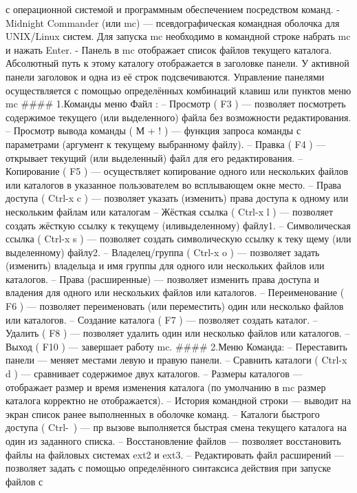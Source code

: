 \documentclass[
  english,
  russian,
  12pt,
  a4paper,
  DIV=11,
  numbers=noendperiod]{scrreprt}
\begin{document}
с операционной системой и программным обеспечением посредством команд. -
Midnight Commander (или mc) --- псевдографическая командная оболочка для
UNIX/Linux систем. Для запуска mc необходимо в командной строке набрать
mc и нажать Enter. - Панель в mc отображает список файлов текущего
каталога. Абсолютный путь к этому каталогу отображается в заголовке
панели. У активной панели заголовок и одна из её строк подсвечиваются.
Управление панелями осуществляется с помощью определённых комбинаций
клавиш или пунктов меню mc \#\#\#\# 1.Команды меню Файл : -- Просмотр (
F3 ) --- позволяет посмотреть содержимое текущего (или выделенного)
файла без возможности редактирования. -- Просмотр вывода команды ( М + !
) --- функция запроса команды с параметрами (аргумент к текущему
выбранному файлу). -- Правка ( F4 ) --- открывает текущий (или
выделенный) файл для его редактирования. -- Копирование ( F5 ) ---
осуществляет копирование одного или нескольких файлов или каталогов в
указанное пользователем во всплывающем окне место. -- Права доступа (
Ctrl-x c ) --- позволяет указать (изменить) права доступа к одному или
нескольким файлам или каталогам -- Жёсткая ссылка ( Ctrl-x l ) ---
позволяет создать жёсткую ссылку к текущему (иливыделенному) файлу1. --
Символическая ссылка ( Ctrl-x s ) --- позволяет создать символическую
ссылку к теку щему (или выделенному) файлу2. -- Владелец/группа ( Ctrl-x
o ) --- позволяет задать (изменить) владельца и имя группы для одного
или нескольких файлов или каталогов. -- Права (расширенные) ---
позволяет изменить права доступа и владения для одного или нескольких
файлов или каталогов. -- Переименование ( F6 ) --- позволяет
переименовать (или переместить) один или несколько файлов или каталогов.
-- Создание каталога ( F7 ) --- позволяет создать каталог. -- Удалить (
F8 ) --- позволяет удалить один или несколько файлов или каталогов. --
Выход ( F10 ) --- завершает работу mc. \#\#\#\# 2.Меню Команда: --
Переставить панели --- меняет местами левую и правую панели. -- Сравнить
каталоги ( Ctrl-x d ) --- сравнивает содержимое двух каталогов. --
Размеры каталогов --- отображает размер и время изменения каталога (по
умолчанию в mc размер каталога корректно не отображается). -- История
командной строки --- выводит на экран список ранее выполненных в
оболочке команд. -- Каталоги быстрого доступа ( Ctrl-~) --- пр вызове
выполняется быстрая смена текущего каталога на один из заданного списка.
-- Восстановление файлов --- позволяет восстановить файлы на файловых
системах ext2 и ext3. -- Редактировать файл расширений --- позволяет
задать с помощью определённого синтаксиса действия при запуске файлов с
\end{document}
